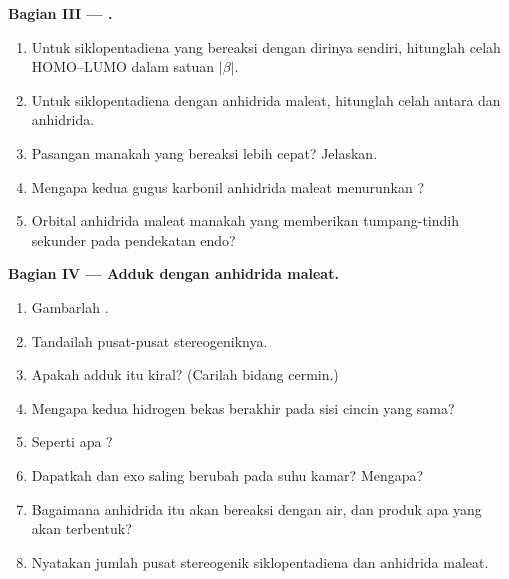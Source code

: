 \begin{problem}
\medskip
\noindent\textbf{Bagian III --- .}
\begin{enumerate}[resume]
  \item Untuk siklopentadiena yang bereaksi dengan dirinya sendiri,
        hitunglah celah HOMO--LUMO dalam satuan $|\beta|$.
  \item Untuk siklopentadiena dengan anhidrida maleat, hitunglah celah
        antara   dan  anhidrida.
  \item Pasangan manakah yang bereaksi lebih cepat? Jelaskan.
  \item Mengapa kedua gugus karbonil anhidrida maleat menurunkan ?
  \item Orbital anhidrida maleat manakah yang memberikan tumpang-tindih
        sekunder pada pendekatan endo?
\end{enumerate}

\medskip
\noindent\textbf{Bagian IV --- Adduk dengan anhidrida maleat.}
\begin{enumerate}[resume]
  \item Gambarlah .
  \item Tandailah pusat-pusat stereogeniknya.
  \item Apakah adduk itu kiral? (Carilah bidang cermin.)
  \item Mengapa kedua hidrogen bekas  berakhir pada sisi cincin yang
        sama?
  \item Seperti apa ?
  \item Dapatkah  dan exo saling berubah pada suhu kamar? Mengapa?
  \item Bagaimana anhidrida itu akan bereaksi dengan air, dan produk apa
        yang akan terbentuk?
  \item Nyatakan jumlah pusat stereogenik  siklopentadiena dan
        anhidrida maleat.
\end{enumerate}
\end{problem}
